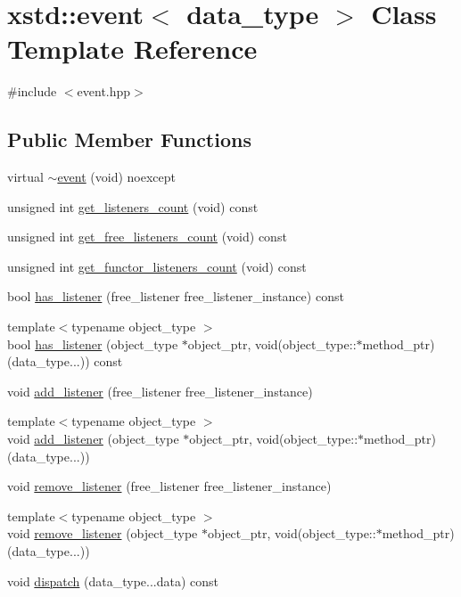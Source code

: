 \hypertarget{classxstd_1_1event}{\section{xstd\-:\-:event$<$ data\-\_\-type $>$ Class Template Reference}
\label{classxstd_1_1event}
}


{\ttfamily \#include $<$event.\-hpp$>$}

\subsection*{Public Member Functions}
\begin{DoxyCompactItemize}
\item 
virtual \hyperlink{classxstd_1_1event_a5818ac871d63b38a5409eb3b153c3bef}{$\sim$event} (void) noexcept
\item 
unsigned int \hyperlink{classxstd_1_1event_af5ce6caa7da361833c3098686a28eb4a}{get\-\_\-listeners\-\_\-count} (void) const 
\item 
unsigned int \hyperlink{classxstd_1_1event_a91e77f734b2fe690615a9684446594a9}{get\-\_\-free\-\_\-listeners\-\_\-count} (void) const 
\item 
unsigned int \hyperlink{classxstd_1_1event_a6aec13f27635f3ad58435337f6063659}{get\-\_\-functor\-\_\-listeners\-\_\-count} (void) const 
\item 
bool \hyperlink{classxstd_1_1event_a28d29a9104d4e8c3986376b2ffca0a48}{has\-\_\-listener} (free\-\_\-listener free\-\_\-listener\-\_\-instance) const 
\item 
{\footnotesize template$<$typename object\-\_\-type $>$ }\\bool \hyperlink{classxstd_1_1event_acbfdc5b60687237a2b42bc6e7d00d4a4}{has\-\_\-listener} (object\-\_\-type $\ast$object\-\_\-ptr, void(object\-\_\-type\-::$\ast$method\-\_\-ptr)(data\-\_\-type...)) const 
\item 
void \hyperlink{classxstd_1_1event_a6d7320f608d4f7b072b62a5e66ea8d62}{add\-\_\-listener} (free\-\_\-listener free\-\_\-listener\-\_\-instance)
\item 
{\footnotesize template$<$typename object\-\_\-type $>$ }\\void \hyperlink{classxstd_1_1event_aa58880f86e0e2e5653df91692f221604}{add\-\_\-listener} (object\-\_\-type $\ast$object\-\_\-ptr, void(object\-\_\-type\-::$\ast$method\-\_\-ptr)(data\-\_\-type...))
\item 
void \hyperlink{classxstd_1_1event_a19e40e6d6af2d565ef741ecfbfb2fda7}{remove\-\_\-listener} (free\-\_\-listener free\-\_\-listener\-\_\-instance)
\item 
{\footnotesize template$<$typename object\-\_\-type $>$ }\\void \hyperlink{classxstd_1_1event_a2ecf3e9a39708db0c28281dbb32d12da}{remove\-\_\-listener} (object\-\_\-type $\ast$object\-\_\-ptr, void(object\-\_\-type\-::$\ast$method\-\_\-ptr)(data\-\_\-type...))
\item 
void \hyperlink{classxstd_1_1event_a60e1b1471f7c50f764fcb8388ca56b47}{dispatch} (data\-\_\-type...\-data) const 
\end{DoxyCompactItemize}
